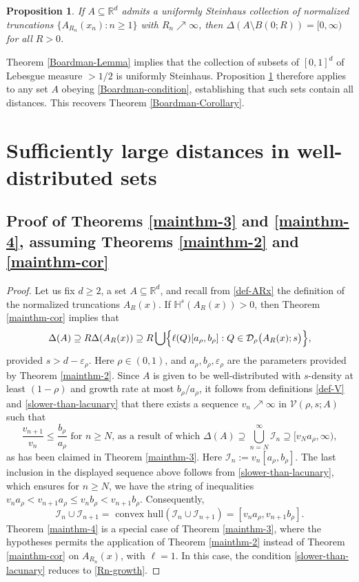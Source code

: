 \documentclass[a4paper,11pt]{amsart}
\newtheorem{prop}[thm]{\bf Proposition}
\numberwithin{equation}{section}
\begin{document}
\begin{prop} \label{unif Steinhaus}
If $A \subseteq \mathbb R^d$ admits a uniformly Steinhaus collection of normalized truncations $\{A_{R_n}(x_n) : n \geq 1\}$ with $R_n \nearrow \infty$, then $\Delta(A \setminus B(0;R)) = [0, \infty)$ for all $R >0$.
\end{prop} 
\noindent Theorem \ref{Boardman-Lemma} implies that the collection of subsets of $[0,1]^d$ of Lebesgue measure $> 1/2$ is uniformly Steinhaus.  Proposition \ref{unif Steinhaus} therefore applies to any set $A$ obeying \eqref{Boardman-condition}, establishing that such sets contain all distances. This recovers Theorem \ref{Boardman-Corollary}.   


\section{Sufficiently large distances in well-distributed sets} \label{Suff-large-distances-section} 
\subsection{Proof of Theorems \ref{mainthm-3} and \ref{mainthm-4}, assuming Theorems \ref{mainthm-2} and \ref{mainthm-cor}} 
\begin{proof} 
Let us fix $d \geq 2$, a set $A \subseteq \mathbb R^d$, and recall from \eqref{def-ARx} the definition of the normalized truncations $A_R(x)$.  If $\mathbb H^s(A_R(x)) > 0$, then Theorem \ref{mainthm-cor} implies that 
\[ \Delta(A) \supseteq R \Delta(A_R(x)) \supseteq R \bigcup \Bigl\{\ell(Q)[a_{\rho}, b_{\rho}] : Q \in \mathcal D_{\rho}\bigl(A_R(x); s\bigr) \Bigr\}, \]
provided $s > d - \varepsilon_{\rho}$. Here $\rho \in (0,1)$, and  $a_{\rho}, b_{\rho}, \varepsilon_{\rho}$ are the parameters provided by Theorem \ref{mainthm-2}. Since $A$ is given to be well-distributed with $s$-density at least $(1- \rho)$ and growth rate at most $b_{\rho}/a_{\rho}$, it follows from definitions \eqref{def-V} and \eqref{slower-than-lacunary} that there exists a sequence $v_n \nearrow \infty$ in $\mathscr V(\rho, s; A)$ such that  
\[ \frac{v_{n+1}}{v_n} \leq \frac{b_{\rho}}{a_{\rho}} \text{ for $n \geq N$, as a result of which } \Delta(A) \supseteq \bigcup_{n=N}^{\infty} \mathscr I_n  \supseteq  [v_N a_{\rho}, \infty), \]
as has been claimed in Theorem \ref{mainthm-3}. Here $\mathscr I_n := v_n[a_{\rho}, b_{\rho}]$. The last inclusion in the displayed sequence above  follows from \eqref{slower-than-lacunary}, which ensures for $n \geq N$, we have the string of inequalities $v_n a_{\rho} < v_{n+1} a_{\rho} \leq v_n b_{\rho} < v_{n+1} b_{\rho}$. Consequently,   
\[ \mathscr{I}_n \cup \mathscr{I}_{n+1} = \text{ convex hull}(\mathscr{I}_n \cup \mathscr{I}_{n+1}) = [v_na_{\rho}, v_{n+1}b_{\rho}]. \]   
\vskip0.1in
\noindent Theorem \ref{mainthm-4} is a special case of Theorem \ref{mainthm-3}, where the hypotheses permits the application of Theorem \ref{mainthm-2} instead of Theorem \ref{mainthm-cor} on $A_{R_n}(x)$, with $\ell = 1$.  In this case, the condition \eqref{slower-than-lacunary} reduces to \eqref{Rn-growth}. 
\end{proof} 
\end{document}
